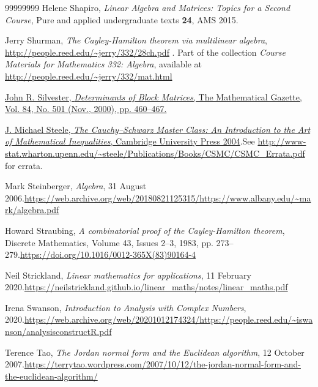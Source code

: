 \documentclass[numbers=enddot,12pt,final,onecolumn,notitlepage]{scrartcl}%
\numberwithin{exer}{subsection}
\theoremstyle{definition}
\begin{document}
\begin{thebibliography}{99999999}
Helene Shapiro, \textit{Linear Algebra and
Matrices: Topics for a Second Course}, Pure and applied undergraduate texts
\textbf{24}, AMS 2015.

Jerry Shurman, \textit{The Cayley-Hamilton theorem
via multilinear algebra}, \url{http://people.reed.edu/~jerry/332/28ch.pdf} .
Part of the collection \textit{Course Materials for Mathematics 332: Algebra},
available at \url{http://people.reed.edu/~jerry/332/mat.html}

%
\href{https://web.archive.org/web/20140505161153/http://www.mth.kcl.ac.uk/~jrs/gazette/blocks.pdf}{John
R. Silvester, \textit{Determinants of Block Matrices}, The Mathematical
Gazette, Vol. 84, No. 501 (Nov., 2000), pp. 460--467.}

%
\href{http://www.ma.huji.ac.il/~ehudf/courses/Ineq09/The Cauchy-Schwarz Master Class .pdf}{J.
Michael Steele, \textit{The Cauchy--Schwarz Master Class: An Introduction to
the Art of Mathematical Inequalities}, Cambridge University Press
2004}.\newline See
\url{http://www-stat.wharton.upenn.edu/~steele/Publications/Books/CSMC/CSMC_Errata.pdf}
for errata.

Mark Steinberger, \textit{Algebra}, 31 August
2006.\newline\url{https://web.archive.org/web/20180821125315/https://www.albany.edu/~mark/algebra.pdf}

Howard Straubing, \textit{A combinatorial proof of
the Cayley-Hamilton theorem}, Discrete Mathematics, Volume 43, Issues 2--3,
1983, pp. 273--279.\newline\url{https://doi.org/10.1016/0012-365X(83)90164-4}

Neil Strickland, \textit{Linear mathematics for
applications}, 11 February 2020.\newline\url{https://neilstrickland.github.io/linear_maths/notes/linear_maths.pdf}

Irena Swanson, \textit{Introduction to Analysis
with Complex Numbers}, 2020.\newline\url{https://web.archive.org/web/20201012174324/https://people.reed.edu/~iswanson/analysisconstructR.pdf}

Terence Tao, \textit{The Jordan normal form and the
Euclidean algorithm}, 12 October 2007.\newline\url{https://terrytao.wordpress.com/2007/10/12/the-jordan-normal-form-and-the-euclidean-algorithm/}


\end{thebibliography}
\end{document}
